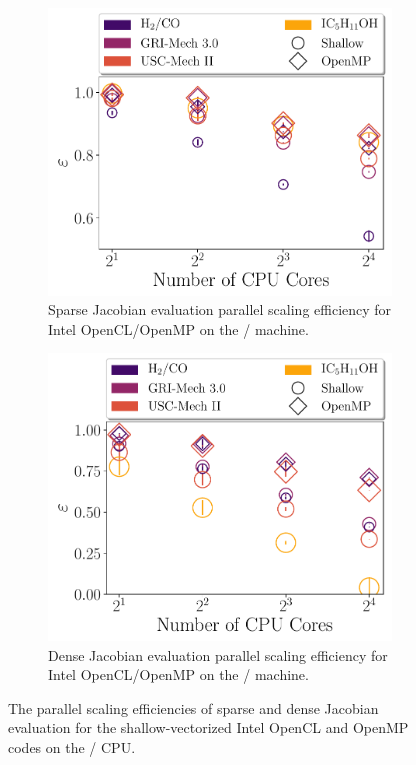 \documentclass[12pt,number,sort&compress,preprint]{elsarticle}
\begin{document}
\begin{figure}[htbp]
   \centering
  \begin{subfigure}[t]{0.48\linewidth}
      \includegraphics[width=\textwidth]{sparse_jac_scaling.pdf}
      \caption{Sparse Jacobian evaluation parallel scaling efficiency for Intel OpenCL\slash OpenMP on the \avx/ machine.}
      \label{F:sparse_jac_scaling}
  \end{subfigure}
  \hfill
  \begin{subfigure}[t]{0.48\linewidth}
      \includegraphics[width=\textwidth]{dense_jac_scaling.pdf}
      \caption{Dense Jacobian evaluation parallel scaling efficiency for Intel OpenCL\slash OpenMP on the \avx/ machine.}
      \label{F:dense_jac_scaling}
  \end{subfigure}
  \caption{The parallel scaling efficiencies of sparse and dense Jacobian evaluation for the shallow-vectorized Intel OpenCL and OpenMP codes on the \avx/ CPU.}
\end{figure}
\end{document}
